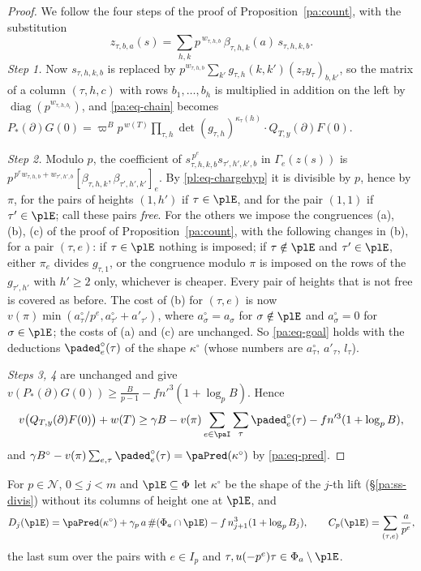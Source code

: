 \documentclass[10pt]{amsart}
\theoremstyle{definition}
\theoremstyle{remark}
\providecommand{\auPa}{\Phi_a}
\providecommand{\auPl}{\Phi}
\begin{document}
\begin{proof}
We follow the four steps of the proof of Proposition~\ref{pa:count}, with the substitution
\[
z_{\tau,b,a}(s)=\sum_{h,k}p^{\,w_{\tau,h,b}}\,\beta_{\tau,h,k}(a)\,s_{\tau,h,k,b}.
\]
\emph{Step 1.} Now $s_{\tau,h,k,b}$ is replaced by $p^{w_{\tau,h,b}}\sum_{k'}g_{\tau,h}(k,k')(z_\tau
y_\tau)_{b,k'}$, so the matrix of a column $(\tau,h,c)$ with rows $b_1,\dots,b_h$ is multiplied in
addition on the left by $\operatorname{diag}(p^{w_{\tau,h,b_i}})$, and \eqref{pa:eq-chain} becomes
$P_*(\partial)G(0)=\varpi^{B}p^{\,w(T)}\prod_{\tau,h}\det(g_{\tau,h})^{\kappa_\tau(h)}\cdot Q_{T,y}
(\partial)F(0)$.

\emph{Step 2.} Modulo $p$, the coefficient of $s_{\tau,h,k,b}^{\,p^e}s_{\tau',h',k',b}$ in
$\Gamma_e(z(s))$ is $p^{\,p^ew_{\tau,h,b}+w_{\tau',h',b}}[\beta_{\tau,h,k},\beta_{\tau',h',k'}]_e$.
By \eqref{pl:eq-chargehyp} it is divisible by $p$, hence by $\pi$, for the pairs of heights
$(1,h')$ if $\tau\in\plE$, and for the pair $(1,1)$ if $\tau'\in\plE$; call these pairs
\emph{free}. For the others we impose the congruences (a), (b), (c) of the proof of
Proposition~\ref{pa:count}, with the following changes in (b), for a pair $(\tau,e)$: if
$\tau\in\plE$ nothing is imposed; if $\tau\notin\plE$ and $\tau'\in\plE$, either $\pi_e$ divides
$g_{\tau,1}$, or the congruence modulo $\pi$ is imposed on the rows of the $g_{\tau',h'}$ with
$h'\ge2$ only, whichever is cheaper. Every pair of heights that is not free is covered as before.
The cost of (b) for $(\tau,e)$ is now $v(\pi)\min(a^\circ_\tau/p^e,a^\circ_{\tau'}+a'_{\tau'})$,
where $a^\circ_\sigma=a_\sigma$ for $\sigma\notin\plE$ and $a^\circ_\sigma=0$ for
$\sigma\in\plE$; the costs of (a) and (c) are unchanged. So \eqref{pa:eq-goal} holds with the
deductions $\paded^\circ_e(\tau)$ of the shape $\kappa^\circ$ (whose numbers are $a^\circ_\tau$,
$a'_\tau$, $l_\tau$).

\emph{Steps 3, 4} are unchanged and give $v(P_*(\partial)G(0))\ge\frac B{p-1}-fn'^3(1+\log_pB)$.
Hence
\[
v\bigl(Q_{T,y}(\partial)F(0)\bigr)+w(T)\ge\gamma B-v(\pi)\sum_{e\in\paI}\sum_\tau\paded^\circ_e
(\tau)-fn'^3(1+\log_pB),
\]
and $\gamma B^\circ-v(\pi)\sum_{e,\tau}\paded_e^\circ(\tau)=\paPred(\kappa^\circ)$ by
\eqref{pa:eq-pred}.
\end{proof}

For $p\in\mathcal N$, $0\le j<m$ and $\plE\subseteq\auPl$ let $\kappa^\circ$ be the shape of the
$j$-th lift (\S\ref{pa:ss-divis}) without its columns of height one at $\plE$, and
\[
D_j(\plE)=\paPred(\kappa^\circ)+\gamma_p\,a\,\#(\auPa\cap\plE)-f\,n_{j+1}^3(1+\log_pB_j),\qquad
C_p(\plE)=\sum_{(\tau,e)}\frac a{p^e},
\]
the last sum over the pairs with $e\in I_p$ and $\tau,u(-p^e)\tau\in\auPa\setminus\plE$.
\end{document}
